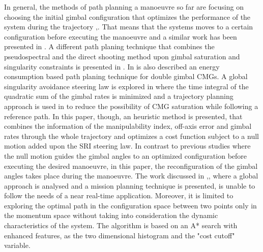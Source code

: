 \documentclass[journal]{new-aiaa}
\begin{document}
In general, the methods of path planning a manoeuvre so far are focusing on choosing the initial gimbal configuration that optimizes the performance of the system during the trajectory \cite{vadali_preferred},\cite{Ramin_optimal}. That means that the systems moves to a certain configuration before executing the manoeuvre and a similar work has been presented in \cite{NANAMORI}. A different path planing technique that combines the pseudospectral and the direct shooting method upon gimbal saturation and singularity constraints is presented in \cite{Qian2014}. In \cite{Cui2015} is also described an energy consumption based path planing technique for double gimbal CMGs. A global singularity avoidance steering law is explored in \cite{Geng2017Global} where the time integral of the quadratic sum of the gimbal rates is minimized and a trajectory planning approach is used in \cite{Yinghong2018} to reduce the possibility of CMG saturation while following a reference path. In this paper, though, an heuristic method is presented, that combines the information of the manipulability index, off-axis error and gimbal rates through the whole trajectory and optimizes a cost function subject to a null motion added upon the SRI steering law. In contrast to previous studies where the null motion guides the gimbal angles to an optimized configuration before executing the desired manoeuvre, in this paper, the reconfiguration of the gimbal angles takes place during the manoeuvre. The work discussed in \cite{paradiso},\cite{paradiso2}, where a global approach is analysed and a mission planning technique is presented, is unable to follow the needs of a near real-time application. Moreover, it is limited to exploring the optimal path in the configuration space between two points only in the momentum space without taking into consideration the dynamic characteristics of the system. The algorithm is based on an A* search with enhanced features, as the two dimensional histogram and the "cost cutoff" variable.
\end{document}
